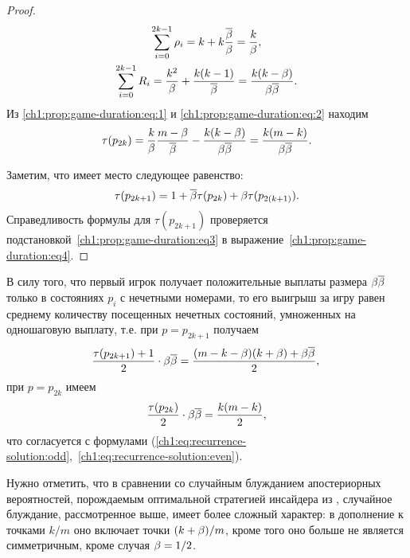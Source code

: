 {\begin{proof}
\begin{equation}
    \begin{gathered}
      \sum_{i=0}^{2k-1} \rho_i = k + k \frac{{\overline{\beta}}}{\beta} = \frac{k}{\beta},\\
      \sum_{i=0}^{2k-1} R_i = \frac{k^2}{\beta} + \frac{k(k-1)}{{\overline{\beta}}} = \frac{k(k-\beta)}{\beta{\overline{\beta}}}.
    \end{gathered}
  \end{equation}
  Из \eqref{ch1:prop:game-duration:eq:1} и \eqref{ch1:prop:game-duration:eq:2} находим
  \begin{gather}
    \label{ch1:prop:game-duration:eq3}
    \tau(p_{2k}) =
    \frac{k}{\beta} \frac{m-\beta}{{\overline{\beta}}} - \frac{k(k-\beta)}{\beta{\overline{\beta}}} =
    \frac{k(m-k)}{\beta{\overline{\beta}}}.
  \end{gather}

  Заметим, что имеет место следующее равенство:
  \begin{equation}
    \label{ch1:prop:game-duration:eq4}
    \tau(p_{2k+1}) = 1 + {\overline{\beta}} \tau(p_{2k}) + \beta \tau(p_{2(k+1)}).
  \end{equation}
  Справедливость формулы для $\tau(p_{2k+1})$ проверяется подстановкой~\eqref{ch1:prop:game-duration:eq3} в выражение~\eqref{ch1:prop:game-duration:eq4}.
\end{proof}

В силу того, что первый игрок получает положительные выплаты размера $\beta{\overline{\beta}}$ только в состояниях $p_i$ с нечетными номерами, то его выигрыш за игру равен среднему количеству посещенных нечетных состояний, умноженных на одношаговую выплату, т.е. при $p = p_{2k+1}$ получаем
\begin{equation*}
  \frac{\tau(p_{2k+1}) + 1}{2} \cdot \beta{\overline{\beta}} = \frac{(m-k-\beta)(k+\beta) + \beta{\overline{\beta}}}{2},\\
\end{equation*}
при $p = p_{2k}$ имеем
\begin{equation*}
  \frac{\tau(p_{2k})}{2} \cdot \beta{\overline{\beta}} = \frac{k(m-k)}{2},
\end{equation*}
что согласуется с формулами
(\ref{ch1:eq:recurrence-solution:odd},~\ref{ch1:eq:recurrence-solution:even}).

Нужно отметить, что в сравнении со случайным блужданием апостериорных вероятностей, порождаемым оптимальной стратегией инсайдера из \cite{domansky07}, случайное блуждание, рассмотренное выше, имеет более сложный характер: в дополнение к точками $k/m$ оно включает точки $(k+\beta)/m$, кроме того оно больше не является симметричным, кроме случая $\beta = 1/2$.

}
